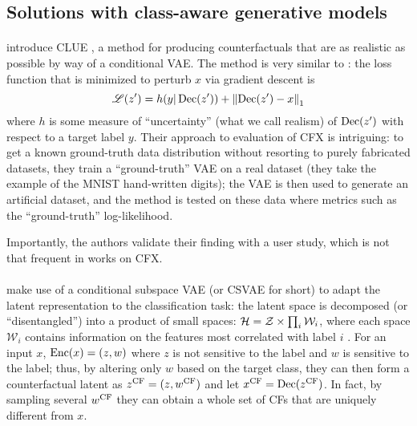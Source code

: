 \documentclass[../main.tex]{subfiles}
\begin{document}
\subsection{Solutions with class-aware generative models}

\paragraph{}

\citeauthor{antoranGetting2021} introduce CLUE \cite{antoranGetting2021}, a method for producing counterfactuals that are as realistic as possible by way of a conditional VAE. The method is very similar to \revise: the loss function that is minimized to perturb $x$ via gradient descent is
\begin{equation}
    \mathscr{L}(z') = h(y | \operatorname{Dec}(z')) + \left\lVert\operatorname{Dec}(z') - x\right\rVert_1
\end{equation}
where $h$ is some measure of ``uncertainty'' (what we call realism) of $\operatorname{Dec}(z')$ with respect to a target label $y$.
Their approach to evaluation of CFX is intriguing:
to get a known ground-truth data distribution without resorting to purely fabricated datasets, they train a ``ground-truth'' VAE on a real dataset (they take the example of the MNIST hand-written digits); the VAE is then used to generate an artificial dataset, and the method is tested on these data where metrics such as the ``ground-truth'' log-likelihood.

Importantly, the authors validate their finding with a user study, which is not that frequent in works on CFX.

\paragraph{}

\citeauthor{downsCRUDS2020} make use of a conditional subspace VAE (or CSVAE for short) to adapt the latent representation to the classification task:
the latent space is decomposed (or ``disentangled'') into a product of small spaces: $\mathcal{H} = \mathcal{Z} \times \prod_{i} \mathcal{W}_i$, where each space $\mathcal{W}_i$ contains information on the features most correlated with label $i$ \cite{klysLearning2018}.
For an input $x$, $\operatorname{Enc}(x) = (z, w)$ where $z$ is not sensitive to the label and $w$ is sensitive to the label; thus, by altering only $w$ based on the target class, they can then form a counterfactual latent as $z^\mathrm{CF} = (z, w^\mathrm{CF})$ and let $x^\mathrm{CF} = \operatorname{Dec}(z^\mathrm{CF})$.
In fact, by sampling several $w^\mathrm{CF}$ they can obtain a whole set of CFs that are uniquely different from $x$.
\end{document}
